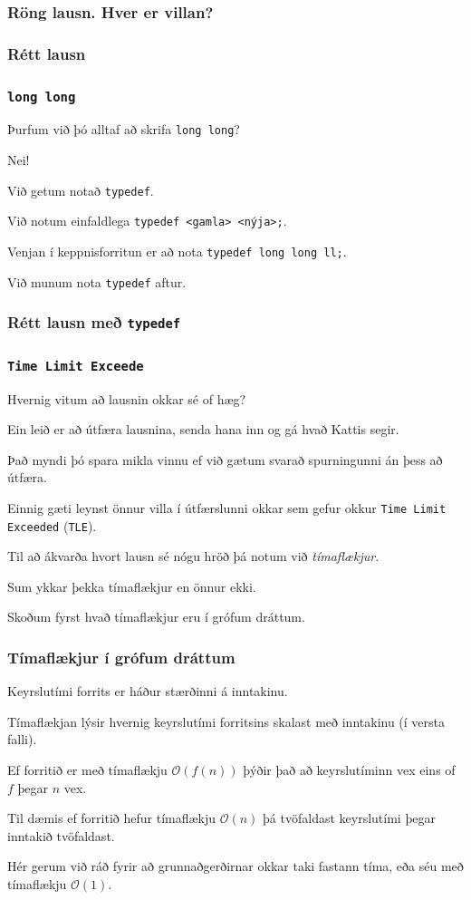 {
	\frametitle{Röng lausn. Hver er villan?}
}

{
	\frametitle{Rétt lausn}
}

{
	\frametitle{\texttt{long long}}
	{
		\item<1-> Þurfum við þó alltaf að skrifa \texttt{long long}?
		\item<2-> Nei!
		\item<3-> Við getum notað \texttt{typedef}.
		\item<4-> Við notum einfaldlega \texttt{typedef <gamla> <nýja>;}.
		\item<5-> Venjan í keppnisforritun er að nota \texttt{typedef long long ll;}.
		\item<6-> Við munum nota \texttt{typedef} aftur.
	}
}

{
	\frametitle{Rétt lausn með \texttt{typedef}}
}

{
	\frametitle{\texttt{Time Limit Exceede}}
	{
		\item<1-> Hvernig vitum að lausnin okkar sé of hæg?
		\item<2-> Ein leið er að útfæra lausnina, senda hana inn og gá hvað Kattis segir.
		\item<3-> Það myndi þó spara mikla vinnu ef við gætum svarað spurningunni án þess að útfæra.
		\item<4-> Einnig gæti leynst önnur villa í útfærslunni okkar sem gefur okkur \texttt{Time Limit Exceeded} (\texttt{TLE}).
		\item<5-> Til að ákvarða hvort lausn sé nógu hröð þá notum við \emph{tímaflækjur}.
		\item<6-> Sum ykkar þekka tímaflækjur en önnur ekki.
		\item<7-> Skoðum fyrst hvað tímaflækjur eru í grófum dráttum.
	}
}

{
	\frametitle{Tímaflækjur í grófum dráttum}
	{
		\item<1-> Keyrslutími forrits er háður stærðinni á inntakinu.
		\item<2-> Tímaflækjan lýsir hvernig keyrslutími forritsins skalast með inntakinu (í versta falli).
		\item<3-> Ef forritið er með tímaflækju $\mathcal{O}(f(n))$ þýðir það að keyrslutíminn vex eins of $f$ þegar $n$ vex.
		\item<4-> Til dæmis ef forritið hefur tímaflækju $\mathcal{O}(n)$ þá tvöfaldast keyrslutími þegar inntakið tvöfaldast.
		\item<5-> Hér gerum við ráð fyrir að grunnaðgerðirnar okkar taki fastann tíma, eða séu með tímaflækju $\mathcal{O}(1)$.
	}
}

